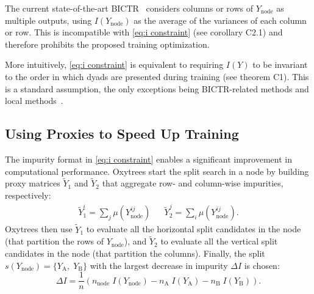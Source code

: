 \documentclass[letterpaper]{article}
\begin{document}
The current state-of-the-art BICTR~\cite{pliakos_drug-target_2020} considers columns or rows of $Y_\text{node}$ as multiple outputs, using $I(Y_\text{node})$ as the average of the variances of each column or row. This is incompatible with \cref{eq:i constraint} (see corollary C2.1) and therefore prohibits the proposed training optimization.

More intuitively, \cref{eq:i constraint} is equivalent to requiring $I(Y)$ to be invariant to the order in which dyads are presented during training (see theorem C1).
This is a standard assumption, the only exceptions being BICTR-related methods and local methods~\cite{schrynemackers_protocols_2013}.


\subsection{Using Proxies to Speed Up Training}
\label{sec:oxytrees training}

The impurity format in \cref{eq:i constraint} enables a significant improvement in computational performance.
%
Oxytrees start the split search in a node by building proxy matrices $\tilde Y_1$ and $\tilde Y_2$ that aggregate row- and column-wise impurities, respectively:
%
\begin{align}
    \label{eq:proxies general}
    \textstyle
    \tilde Y_1^i = \sum_{j} \mu(Y_\text{node}^{ij})
    &&
    \textstyle
    \tilde Y_2^j = \sum_{i} \mu(Y_\text{node}^{ij})
    \text{.}
\end{align}
Oxytrees then use $\tilde Y_1$ to evaluate all the horizontal split candidates in the node (that partition the rows of $Y_\text{node}$), and $\tilde Y_2$ to evaluate all the vertical split candidates in the node (that partition the columns).
Finally, the split $s(Y_\text{node}) = \{Y_\text{A},\; Y_\text{B}\}$ with the largest decrease in impurity $\Delta I$ is chosen:
\begin{equation}
    \label{eq:delta i}
    \textstyle
    \Delta I =
        \frac{1}{n}(
            n_\text{node}\;I(Y_\text{node})
            - n_\text{A}\;I(Y_\text{A})
            - n_\text{B}\;I(Y_\text{B})
        )
        \text{.}
\end{equation}
\end{document}
